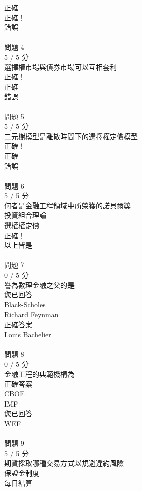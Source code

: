 \begin{multicols}{3}
  正確 \\
正確！\\
  錯誤 \\
 \\
問題 4\\
5 / 5 分\\
選擇權市場與債券市場可以互相套利\\
正確！\\
  正確 \\
  錯誤 \\
 \\
問題 5\\
5 / 5 分\\
二元樹模型是離散時間下的選擇權定價模型\\
正確！\\
  正確 \\
  錯誤 \\
 \\
問題 6\\
5 / 5 分\\
何者是金融工程領域中所榮獲的諾貝爾獎\\
  投資組合理論 \\
  選權權定價 \\
正確！\\
  以上皆是 \\
 \\
問題 7\\
0 / 5 分\\
譽為數理金融之父的是\\
您已回答\\
  Black-Scholes \\
  Richard Feynman \\
正確答案\\
  Louis Bachelier \\
 \\
問題 8\\
0 / 5 分\\
金融工程的典範機構為\\
正確答案\\
  CBOE \\
  IMF \\
您已回答\\
  WEF \\
 \\
問題 9\\
5 / 5 分\\
期貨採取哪種交易方式以規避違約風險\\
  保證金制度 \\
  每日結算 \\

\end{multicols}

